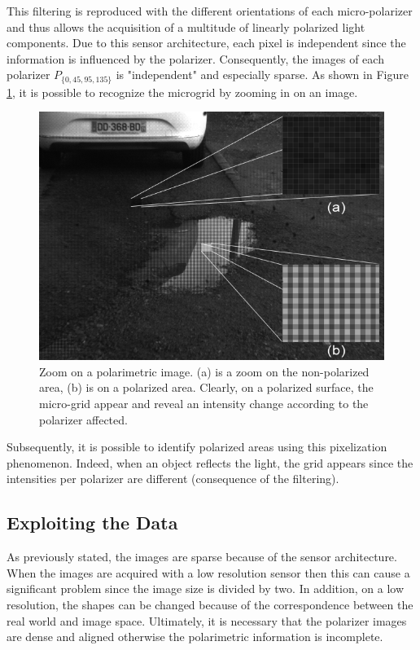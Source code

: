 This filtering is reproduced with the different orientations of each micro-polarizer and thus allows the acquisition of a multitude of linearly polarized light components. 
Due to this sensor architecture, each pixel is independent since the information is influenced by the polarizer. Consequently, the images of each polarizer $P_{\{0,45,95,135\}}$ is "independent" and especially sparse. As shown in Figure \ref{fig:polaexplain}, it is possible to recognize the microgrid by zooming in on an image.

\begin{figure}[h]
	\centering
	\includegraphics[width=0.6\linewidth]{Figures/VISAPP/polaexplain}
	\caption[Zoom on a polarimetric image.]{Zoom on a polarimetric image. (a) is a zoom on the non-polarized area, (b) is on a polarized area. Clearly, on a polarized surface, the micro-grid appear and reveal an intensity change according to the polarizer affected.}
	\label{fig:polaexplain}
\end{figure}

Subsequently, it is possible to identify polarized areas using this pixelization phenomenon. Indeed, when an object reflects the light, the grid appears since the intensities per polarizer are different (consequence of the filtering).


\subsection{Exploiting the Data}\label{exploitdata}


As previously stated, the images are sparse because of the sensor architecture. When the images are acquired with a low resolution sensor then this can cause a significant problem since the image size is divided by two. In addition, on a low resolution, the shapes can be changed because of the correspondence between the real world and image space. Ultimately, it is necessary that the polarizer images are dense and aligned otherwise the polarimetric information is incomplete.

